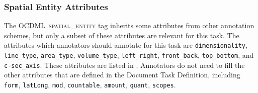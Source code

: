 \documentclass[11pt]{article}
\newcommand{\ML}{OCDML}
\newenvironment{note}
{\list{}
 {\setlength
  {\itemindent}
  {\listparindent}}
   \item[\textbf{Note:}]\relax}
{\endlist}
\begin{document}
\begin{note}
    
\end{note}


\subsubsection{Spatial Entity Attributes} %
\label{ssub:spatial_entity_attributes}

The \ML~\textsc{spatial\_entity} tag inherits some attributes from other annotation schemes, but only a subset of these attributes are relevant for this task. The attributes which annotators should annotate for this task are \texttt{dimensionality}, \texttt{line\_type}, \texttt{area\_type}, \texttt{volume\_type}, \texttt{left\_right}, \texttt{front\_back}, \texttt{top\_bottom}, and \texttt{c-sec\_axis}. These attributes are listed in . Annotators do not need to fill the other attributes that are defined in the Document Task Definition, including \texttt{form}, \texttt{latLong}, \texttt{mod}, \texttt{countable}, \texttt{amount}, \texttt{quant}, \texttt{scopes}.
\end{document}
